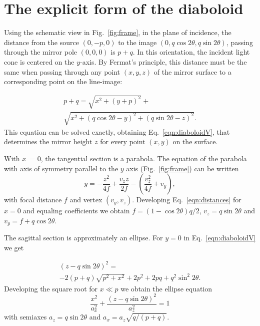 \documentclass{iucr}       %
\begin{document}
\appendix

\section{The explicit form of the diaboloid }
\label{appendix:diaboloid}

Using the schematic view in Fig.~\ref{fig:frame}, in the plane of incidence, the distance from the source $(0,-p,0)$ to the image $(0,q \cos2\theta, q \sin2\theta)$, passing through the mirror pole $(0,0,0)$ is $p+q$. In this orientation, the incident light cone is centered on the $y$-axis. By Fermat's principle, this distance must be the same when passing through any point $(x,y,z)$ of the mirror surface to a corresponding point on the line-image:

\begin{multline}
\label{eqn:distances}
p + q = 
\sqrt{x^2 + (y + p)^2} + \\
\sqrt{x^2 + (q \cos2 \theta - y)^2 + (q \sin2 \theta - z)^2}.
\end{multline}
This equation can be solved exactly, obtaining Eq.~\ref{eqn:diaboloidV}, that determines the mirror height $z$ for every point $(x,y)$ on the surface.

With $x$~= 0, the tangential section is a parabola. The equation of the parabola with axis of symmetry parallel to the $y$ axis (Fig.~\ref{fig:frame}) can be written 
\begin{equation}
y = -\frac{z^2}{4 f} + \frac{v_z z}{2 f} - \left(\frac{v_z^2}{4 f} + v_y\right),
\end{equation}
\noindent with focal distance $f$ and vertex $(v_y,v_z)$. Developing Eq.~\ref{eqn:distances} for $x=0$ and equaling coefficients we obtain $f=(1-\cos2\theta)q/2$, $v_z=q \sin2\theta$ and $v_y=f+q\cos2\theta$.

The sagittal section is approximately an ellipse. For $y=0$ in Eq.~\ref{eqn:diaboloidV} we get

\begin{multline}
\label{eqn:ellipse}
(z - q \sin2\theta)^2 = \\
-2 (p + q) \sqrt{p^2 + x^2}+ 
2 p^2 +2 p q + q^2 \sin^2 2 \theta.
\end{multline}
Developing the square root for $x\ll p$ we obtain the ellipse equation
\begin{equation}
\label{eqn:ellipse}
\frac{x^2}{a_x^2} + \frac{(z-q \sin2\theta)^2}{a_z^2}=1
\end{equation}
with semiaxes $a_z=q \sin2\theta$ and $a_x=a_z\sqrt{q/(p+q)}$.
\end{document}

